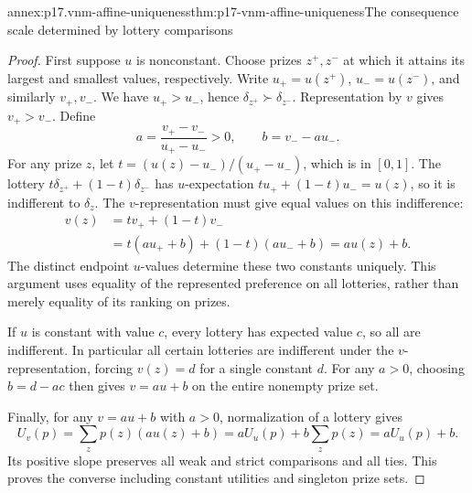 \begin{annexitem}{annex:p17.vnm-affine-uniqueness}{thm:p17-vnm-affine-uniqueness}{The consequence scale determined by lottery comparisons}
\begin{proof}
First suppose \(u\) is nonconstant. Choose prizes \(z^+,z^-\) at
which it attains its largest and smallest values, respectively. Write
\(u_+=u(z^+)\), \(u_-=u(z^-)\), and similarly \(v_+,v_-\).
We have \(u_+>u_-\), hence \(\delta_{z^+}\succ\delta_{z^-}\).
Representation by \(v\) gives \(v_+>v_-\). Define
\[
                  a=\frac{v_+-v_-}{u_+-u_-}>0,
                  \qquad b=v_- -a u_-.
\]
For any prize \(z\), let
\(t=(u(z)-u_-)/(u_+-u_-)\), which is in \([0,1]\). The lottery
\(t\delta_{z^+}+(1-t)\delta_{z^-}\) has \(u\)-expectation
\(t u_++(1-t)u_-=u(z)\), so it is indifferent to \(\delta_z\).
The \(v\)-representation must give equal values on this indifference:
\[
\begin{aligned}
 v(z)&=t v_++(1-t)v_-\\
     &=t(a u_++b)+(1-t)(a u_-+b)
       =a u(z)+b.
\end{aligned}
\]
The distinct endpoint \(u\)-values determine these two constants
uniquely. This argument uses equality of the represented preference on
all lotteries, rather than merely equality of its ranking on prizes.

If \(u\) is constant with value \(c\), every lottery has expected
value \(c\), so all are indifferent. In particular all certain lotteries
are indifferent under the \(v\)-representation, forcing \(v(z)=d\)
for a single constant \(d\). For any \(a>0\), choosing \(b=d-ac\)
then gives \(v=a u+b\) on the entire nonempty prize set.

Finally, for any \(v=a u+b\) with \(a>0\), normalization of a
lottery gives
\[
 U_v(p)=\sum_zp(z)(a u(z)+b)
       =aU_u(p)+b\sum_zp(z)=aU_u(p)+b.
\]
Its positive slope preserves all weak and strict comparisons and all
ties. This proves the converse including constant utilities and
singleton prize sets.
\end{proof}
\end{annexitem}

